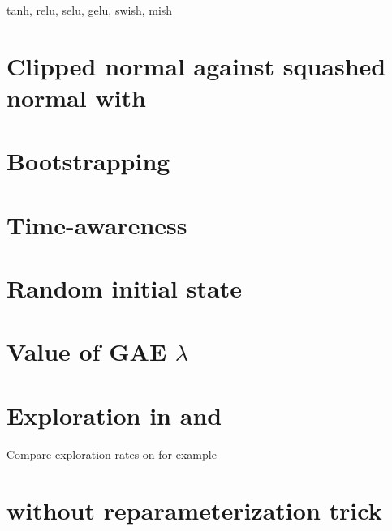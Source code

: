 tanh, relu, selu, gelu, swish, mish

\section{Clipped normal against squashed normal with \ppo}

\section{Bootstrapping}

\section{Time-awareness}

\section{Random initial state}

\section{Value of GAE $\lambda$}

\section{Exploration in \tdt and \sac}

Compare exploration rates on  for example

\section{\sac without reparameterization trick}
